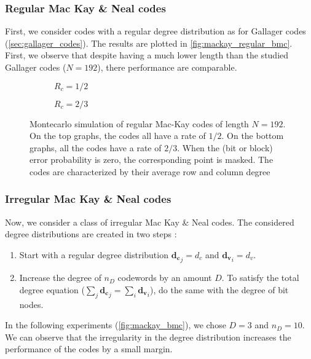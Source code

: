 \subsubsection{Regular Mac Kay \& Neal codes}
First, we consider codes with a regular degree distribution as for Gallager
codes (\autoref{sec:gallager_codes}). The results are plotted in
\autoref{fig:mackay_regular_bmc}. First, we observe that despite having a much
lower length than the studied Gallager codes ($N=192$), there performance are
comparable.

\begin{figure}
    \centering
    \begin{subfigure}{\textwidth}
        \centering
        
        \caption{$R_c = 1/2$}
    \end{subfigure}%

    \begin{subfigure}{\textwidth}
        \centering
        
        \caption{$R_c = 2/3$}
    \end{subfigure}%
    \caption[Montecarlo simulation of regular Mac-Kay codes of length $N = 192$]{%
        Montecarlo simulation of regular Mac-Kay codes of length $N = 192$. On the top
        graphs, the codes all have a rate of $1/2$. On the bottom graphs, all
        the codes have a rate of $2/3$. When the (bit or block) error
        probability is zero, the corresponding point is masked. The codes are
        characterized by their average row and column degree%
    }
    \label{fig:mackay_regular_bmc}
\end{figure}

\subsubsection{Irregular Mac Kay \& Neal codes}
Now, we consider a class of irregular Mac Kay \& Neal codes. The considered
degree distributions are created in two steps :
\begin{enumerate}
    \item Start with a regular degree distribution $\bm{{d_c}}_j = d_c$ and
          $\bm{{d_v}}_i = d_v$.
    \item Increase the degree of $n_D$ codewords by an amount $D$. To satisfy
          the total degree equation ($\sum_j \bm{{d_c}}_j = \sum_i
              \bm{{d_v}}_i$), do the same with the degree of bit nodes.
\end{enumerate}
In the following experiments (\autoref{fig:mackay_bmc}), we chose $D = 3$ and
$n_D = 10$. We can observe that the irregularity in the degree distribution
increases the performance of the codes by a small margin.

